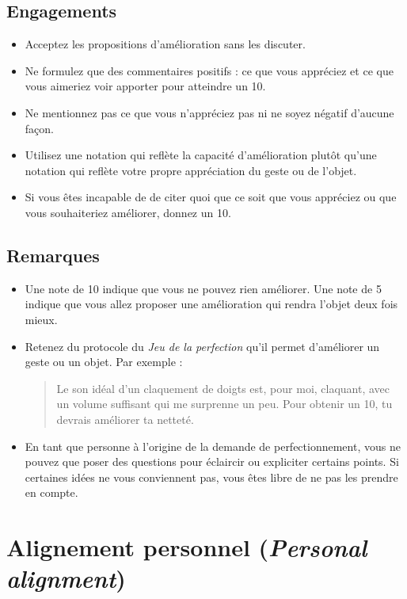 \documentclass[11pt]{book}
\let\oldsection\section
\renewcommand\section{\clearpage\oldsection}
\begin{document}
\subsection{Engagements}
\begin{itemize}
	\item Acceptez les propositions d'amélioration sans les discuter.
	\item Ne formulez que des commentaires positifs : ce que vous appréciez et ce que vous aimeriez voir apporter pour atteindre un 10.
	\item Ne mentionnez pas ce que vous n'appréciez pas ni ne soyez négatif d'aucune façon.
	\item Utilisez une notation qui reflète la capacité d'amélioration plutôt qu'une notation qui reflète votre propre appréciation du geste ou de l'objet.
	\item Si vous êtes incapable de de citer quoi que ce soit que vous appréciez ou que vous souhaiteriez améliorer, donnez un 10.
\end{itemize}

\subsection{Remarques}
\begin{itemize}
	\item Une note de 10 indique que vous ne pouvez rien améliorer. Une note de 5 indique que vous allez proposer une amélioration qui rendra l'objet deux fois mieux.
	\item Retenez du protocole du \emph{Jeu de la perfection} qu'il permet d'améliorer un geste ou un objet. Par exemple :
	      \begin{quote}
	      	\og{}Le son idéal d'un claquement de doigts est, pour moi, claquant, avec un volume suffisant qui me surprenne un peu. Pour obtenir un 10, tu devrais
	        améliorer ta netteté.\fg{}
	      \end{quote}
	\item En tant que personne à l'origine de la demande de perfectionnement, vous ne pouvez que poser des questions pour éclaircir ou expliciter certains points.
	      Si certaines idées ne vous conviennent pas, vous êtes libre de ne pas les prendre en compte.
\end{itemize}

\section{Alignement personnel (\emph{Personal alignment})}
\end{document}
